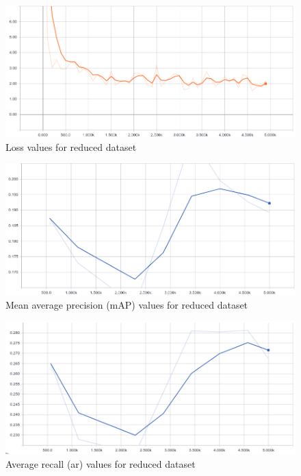 \documentclass[12pt]{report}
\begin{document}
\vspace{0.5cm}
\begin{figure}[ht!]
	\centering
	\includegraphics[width=12cm]{loss-smalldata-5k}
	\caption{Loss values for reduced dataset}
	\label{fig:loss-smalldata-5k}
\end{figure}

\vspace{0.5cm}
\begin{figure}[ht!]
	\centering
	\includegraphics[width=12cm]{map-smalldata-5k}
	\caption{Mean average precision (mAP) values for reduced dataset}
	\label{fig:map-smalldata-5k}
\end{figure}

\vspace{0.5cm}
\begin{figure}[ht!]
	\centering
	\includegraphics[width=12cm]{ar-smalldata-5k}
	\caption{Average recall (ar) values for reduced dataset}
	\label{fig:ar-smalldata-5k}
\end{figure}
\end{document}
